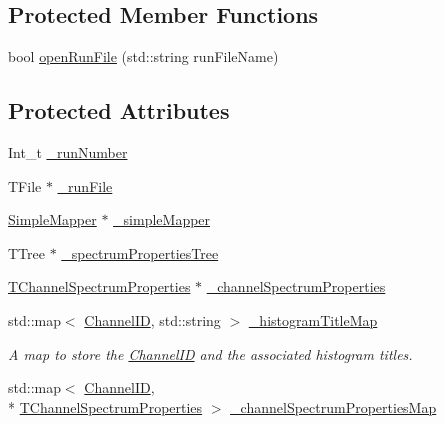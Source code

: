\subsection*{Protected Member Functions}
\begin{DoxyCompactItemize}
\item 
bool \hyperlink{class_spectrum_properties_run_info_a8253f12715497ad525f27104c8ce4a85}{open\-Run\-File} (std\-::string run\-File\-Name)
\end{DoxyCompactItemize}
\subsection*{Protected Attributes}
\begin{DoxyCompactItemize}
\item 
Int\-\_\-t \hyperlink{class_spectrum_properties_run_info_af3b62d094196da758718fbc1d05eed96}{\-\_\-run\-Number}
\item 
T\-File $\ast$ \hyperlink{class_spectrum_properties_run_info_aab03a803b16b50f0d444f031b41ffebc}{\-\_\-run\-File}
\item 
\hyperlink{class_simple_mapper}{Simple\-Mapper} $\ast$ \hyperlink{class_spectrum_properties_run_info_a1a2747ac99761940eb128ca041014dc2}{\-\_\-simple\-Mapper}
\item 
T\-Tree $\ast$ \hyperlink{class_spectrum_properties_run_info_ae3cb4e7dd3f4d8fc02094738ba60cfca}{\-\_\-spectrum\-Properties\-Tree}
\item 
\hyperlink{class_t_channel_spectrum_properties}{T\-Channel\-Spectrum\-Properties} $\ast$ \hyperlink{class_spectrum_properties_run_info_a905d33381539ab3737b6c55261e0fc1f}{\-\_\-channel\-Spectrum\-Properties}
\item 
std\-::map$<$ \hyperlink{class_spectrum_properties_run_info_1_1_channel_i_d}{Channel\-I\-D}, std\-::string $>$ \hyperlink{class_spectrum_properties_run_info_a9e75eca5cf3a61ec892a62862d159111}{\-\_\-histogram\-Title\-Map}
\begin{DoxyCompactList}\small\item\em A map to store the \hyperlink{class_spectrum_properties_run_info_1_1_channel_i_d}{Channel\-I\-D} and the associated histogram titles. \end{DoxyCompactList}\item 
std\-::map$<$ \hyperlink{class_spectrum_properties_run_info_1_1_channel_i_d}{Channel\-I\-D}, \\*
\hyperlink{class_t_channel_spectrum_properties}{T\-Channel\-Spectrum\-Properties} $>$ \hyperlink{class_spectrum_properties_run_info_a673b97ff771527ce85493856e80e7b83}{\-\_\-channel\-Spectrum\-Properties\-Map}

\end{DoxyCompactItemize}
